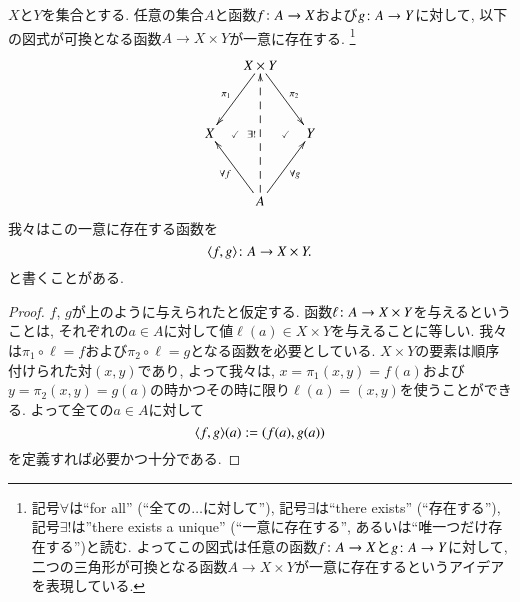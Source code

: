 \begin{lemma}
$X$と$Y$を集合とする. 任意の集合$A$と函数$f\colon A\rightarrow X$および$g\colon A\rightarrow Y$に対して, 以下の図式が可換となる函数$A\to X\times Y$が一意に存在する. \footnote{記号$\forall$は``for all'' (``全ての$\dots$に対して''), 記号$\exists$は``there exists'' (``存在する''), 記号$\exists!$は''there exists a unique'' (``一意に存在する'', あるいは``唯一つだけ存在する'')と読む. よってこの図式は任意の函数$f\colon A\rightarrow X$と$g\colon A\rightarrow Y$に対して, 二つの三角形が可換となる函数$A\to X\times Y$が一意に存在するというアイデアを表現している.}
\begin{align}\label{dia:univ prop for products}
\xymatrix@=15pt{&X\times Y\ar[ldd]_{\pi_1}\ar[rdd]^{\pi_2}\\\\X\ar@{}[r]|{\checkmark}&&Y\ar@{}[l]|{\checkmark}\\\\&A\ar[luu]^{\forall f}\ar[ruu]_{\forall g}\ar@{-->}[uuuu]^{\exists !}}
\end{align}
我々はこの一意に存在する函数を$$\langle f,g\rangle\colon A\rightarrow X\times Y.$$と書くことがある.

\end{lemma}

\begin{proof}


$f$, $g$が上のように与えられたと仮定する. 函数$\ell\colon A\rightarrow X\times Y$を与えるということは, それぞれの$a\in A$に対して値$\ell(a)\in X\times Y$を与えることに等しい. 我々は$\pi_1\circ \ell=f$および$\pi_2\circ \ell=g$となる函数を必要としている. $X\times Y$の要素は順序付けられた対$(x,y)$であり, よって我々は, $x=\pi_1(x,y)=f(a)$および$y=\pi_2(x,y)=g(a)$の時かつその時に限り$\ell(a)=(x,y)$を使うことができる. よって全ての$a\in A$に対して$$\langle f,g\rangle(a):=(f(a),g(a))$$を定義すれば必要かつ十分である.

\end{proof}

